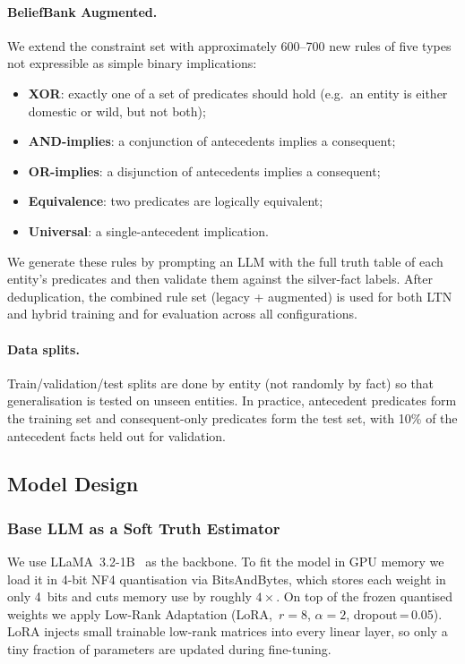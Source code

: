 \documentclass[11pt,a4paper]{article}
\begin{document}
\paragraph{BeliefBank Augmented.}
We extend the constraint set with approximately 600--700 new rules of five
types not expressible as simple binary implications:
\begin{itemize}[nosep]
  \item \textbf{XOR}: exactly one of a set of predicates should hold
        (e.g.\ an entity is either domestic or wild, but not both);
  \item \textbf{AND-implies}: a conjunction of antecedents implies a
        consequent;
  \item \textbf{OR-implies}: a disjunction of antecedents implies a
        consequent;
  \item \textbf{Equivalence}: two predicates are logically equivalent;
  \item \textbf{Universal}: a single-antecedent implication.
\end{itemize}
We generate these rules by prompting an LLM with the full truth table of
each entity's predicates and then validate them against the silver-fact
labels.  After deduplication, the combined rule set (legacy + augmented) is
used for both LTN and hybrid training and for evaluation across all
configurations.

\paragraph{Data splits.}
Train/validation/test splits are done by entity (not randomly by
fact) so that generalisation is tested on unseen entities.  In practice,
antecedent predicates form the training set and consequent-only predicates
form the test set, with 10\% of the antecedent facts held out for
validation.

\subsection{Model Design}

\subsubsection{Base LLM as a Soft Truth Estimator}

We use LLaMA~3.2-1B~\cite{llama32} as the backbone.  To fit the model in
GPU memory we load it in 4-bit NF4 quantisation via BitsAndBytes, which
stores each weight in only 4~bits and cuts memory use by roughly
$4\times$.  On top of the frozen quantised weights we apply Low-Rank
Adaptation (LoRA,~$r{=}8$, $\alpha{=}2$, dropout\,=\,0.05).  LoRA
injects small trainable low-rank matrices into every linear layer, so
only a tiny fraction of parameters are updated during fine-tuning.
\end{document}
